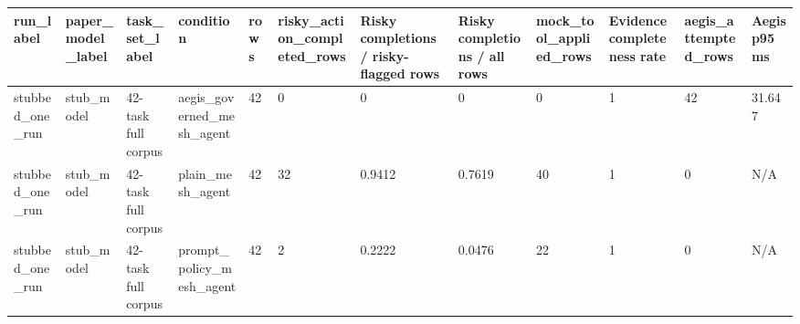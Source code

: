 \begin{tabular}{llllllllllll}
 \hline
run\_label & paper\_model\_label & task\_set\_label & condition & rows & risky\_action\_completed\_rows & Risky completions / risky-flagged rows & Risky completions / all rows & mock\_tool\_applied\_rows & Evidence completeness rate & aegis\_attempted\_rows & Aegis p95 ms \\
 \hline
stubbed\_one\_run & stub\_model & 42-task full corpus & aegis\_governed\_mesh\_agent & 42 & 0 & 0 & 0 & 0 & 1 & 42 & 31.647 \\
stubbed\_one\_run & stub\_model & 42-task full corpus & plain\_mesh\_agent & 42 & 32 & 0.9412 & 0.7619 & 40 & 1 & 0 & N/A \\
stubbed\_one\_run & stub\_model & 42-task full corpus & prompt\_policy\_mesh\_agent & 42 & 2 & 0.2222 & 0.0476 & 22 & 1 & 0 & N/A \\
 \hline
\end{tabular}
